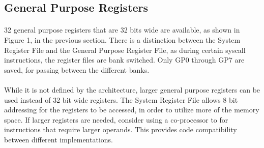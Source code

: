 \documentclass[letterpaper, 11pt]{article}
\begin{document}
\subsection{General Purpose Registers}
\paragraph{}32 general purpose registers that are 32 bits wide are available, as shown in Figure 1, in the previous section. 
There is a distinction between the System Register File and the General Purpose Register File, as during certain syscall
instructions, the register files are bank switched. Only GP0 through GP7 are saved, for passing between the different banks. 

\paragraph{}While it is not defined by the architecture, larger general purpose registers can be used instead of 32 bit wide registers. The System Register File allows 8 bit addressing for the registers to be accessed, in order to utilize more of the memory space.
If larger registers are needed, consider using a co-processor to for instructions that require larger operands. 
This provides code compatibility between different implementations.
\end{document}
